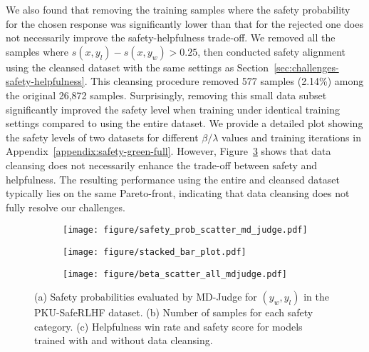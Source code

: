 We also found that removing the training samples where the safety probability for the chosen response was significantly lower than that for the rejected one does not necessarily improve the safety-helpfulness trade-off. We removed all the samples where $s(x, y_l) - s(x, y_w) > 0.25$, then conducted safety alignment using the cleansed dataset with the same settings as Section~\ref{sec:challenges-safety-helpfulness}. This cleansing procedure removed 577 samples (2.14\%) among the original 26,872 samples. Surprisingly, removing this small data subset significantly improved the safety level when training under identical training settings compared to using the entire dataset. We provide a detailed plot showing the safety levels of two datasets for different $\beta/\lambda$ values and training iterations in Appendix~\ref{appendix:safety-green-full}. However, Figure~\ref{fig:beta_scatter_plot} shows that data cleansing does not necessarily enhance the trade-off between safety and helpfulness. The resulting performance using the entire and cleansed dataset typically lies on the same Pareto-front, indicating that data cleansing does not fully resolve our challenges.


\begin{figure*}[t]
    \centering
    \begin{subfigure}[b]{0.26\hsize}
        \centering
        \texttt{[image: figure/safety\_prob\_scatter\_md\_judge.pdf]}
        \caption{}
        \label{fig:safety_prob_heatmap}
    \end{subfigure}%
    \begin{subfigure}[b]{0.4\hsize}
        \centering
        \texttt{[image: figure/stacked\_bar\_plot.pdf]}
        \caption{}
        \label{fig:stacked_bar_plot}
    \end{subfigure}%
    \hspace{2mm}
    \begin{subfigure}[b]{0.31\hsize}
        \centering
        \texttt{[image: figure/beta\_scatter\_all\_mdjudge.pdf]}
        \caption{}        
        \label{fig:beta_scatter_plot}
    \end{subfigure}
    \caption{(a) Safety probabilities evaluated by MD-Judge for $(y_w, y_l)$ in the PKU-SafeRLHF dataset. (b) Number of samples for each safety category. (c) Helpfulness win rate and safety score for models trained with and without data cleansing.
    \label{fig:challenges}}
\end{figure*}